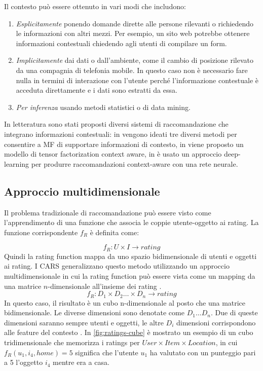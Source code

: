 \noindent Il contesto può essere ottenuto in vari modi \cite{recsys-handbook} che includono:
\begin{enumerate}
 \item \textit{Esplicitamente} ponendo domande dirette alle persone rilevanti o richiedendo le informazioni con altri mezzi. Per esempio, un sito web potrebbe ottenere informazioni contestuali chiedendo agli utenti di compilare un form.
 \item \textit{Implicitamente} dai dati o dall'ambiente, come il cambio di posizione rilevato da una compagnia di telefonia mobile. In questo caso non è necessario fare nulla in termini di interazione con l'utente perché l'informazione contestuale è acceduta direttamente e i dati sono estratti da essa.
 \item \textit{Per inferenza} usando metodi statistici o di data mining. 
\end{enumerate}
In letteratura sono stati proposti diversi sistemi di raccomandazione che integrano informazioni contestuali: in \cite{mf-context-aware} vengono ideati tre diversi metodi per consentire a MF di supportare informazioni di contesto, in \cite{tensor-context-aware} viene proposto un modello di tensor factorization context aware, in \cite{context-aware-deep-learning} è usato un approccio deep-learning per produrre raccomandazioni context-aware con una rete neurale.

\subsection{Approccio multidimensionale}
Il problema tradizionale di raccomandazione può essere visto come l'apprendimento di una funzione che associa le coppie utente-oggetto ai rating. La funzione corrispondente $f_R$ è definita come:

$$
f_R : U \times I \rightarrow rating
$$
Quindi la rating function mappa da uno spazio bidimensionale di utenti e oggetti ai rating.
I CARS generalizzano questo metodo utilizzando un approccio multidimensionale in cui la rating function può essere vista come un mapping da una matrice $n$-dimensionale all'insieme dei rating \cite{survey-mattia}.
$$
f_R : D_1 \times D_2 \dots \times D_n \rightarrow rating
$$
In questo caso, il risultato è un cubo n-dimensionale al posto che una matrice bidimensionale. Le diverse dimensioni sono denotate come $D_1 \dots D_n$. Due di queste dimensioni saranno sempre utenti e oggetti, le altre $D_i$ dimensioni corrispondono alle feature del contesto \cite{recsys-book}. In \autoref{fig:ratings-cube} è mostrato un esempio di un cubo tridimensionale che memorizza i ratings per $User \times Item \times Location$, in cui $f_R(u_1, i_4, home) = 5$ significa che l'utente $u_1$ ha valutato con un punteggio pari a 5 l'oggetto $i_4$ mentre era a casa.

